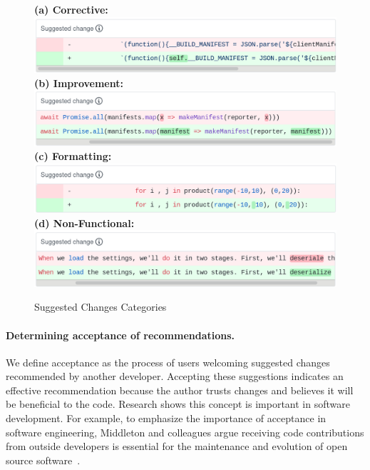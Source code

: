 \begin{figure}[]
\centering
    \textbf{(a) Corrective: \\}
    \includegraphics[width=\textwidth]{images/correct.png}
    \textbf{(b) Improvement: \\}
    \includegraphics[width=\textwidth]{images/improve.png}
    \textbf{(c) Formatting: \\}
    \includegraphics[width=\textwidth]{images/format.png}
    \textbf{(d) Non-Functional: \\}
    \includegraphics[width=\textwidth]{images/nonfunc.png}
    \caption{Suggested Changes Categories}    
    \label{fig:categories} 
\end{figure}

\paragraph{Determining acceptance of recommendations.}

We define acceptance as the process of users welcoming suggested changes recommended by another developer. Accepting these suggestions indicates an effective recommendation because the author trusts changes and believes it will be beneficial to the code. Research shows this concept is important in software development. For example, to emphasize the importance of acceptance in software engineering, Middleton and colleagues argue receiving code contributions from outside developers is essential for the maintenance and evolution of open source software~\cite{Middleton2018Contributions}.

